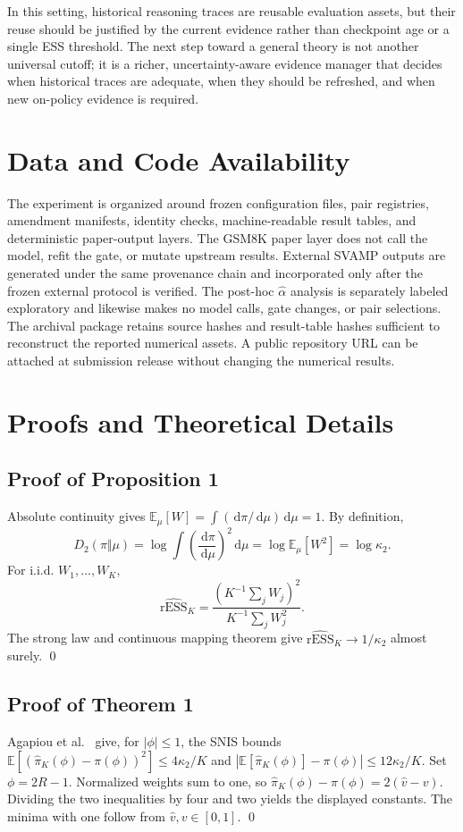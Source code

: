 \documentclass[10pt]{article}
\theoremstyle{remark}
\newcommand{\E}{\mathbb{E}}
\newcommand{\rESS}{\mathrm{rESS}}
\newcommand{\dd}{\,\mathrm{d}}
\begin{document}
In this setting, historical reasoning traces are reusable evaluation assets, but their reuse should be justified by the current evidence rather than checkpoint age or a single ESS threshold. The next step toward a general theory is not another universal cutoff; it is a richer, uncertainty-aware evidence manager that decides when historical traces are adequate, when they should be refreshed, and when new on-policy evidence is required.

\section*{Data and Code Availability}
The experiment is organized around frozen configuration files, pair registries, amendment manifests, identity checks, machine-readable result tables, and deterministic paper-output layers. The GSM8K paper layer does not call the model, refit the gate, or mutate upstream results. External SVAMP outputs are generated under the same provenance chain and incorporated only after the frozen external protocol is verified. The post-hoc $\widehat\alpha$ analysis is separately labeled exploratory and likewise makes no model calls, gate changes, or pair selections. The archival package retains source hashes and result-table hashes sufficient to reconstruct the reported numerical assets. A public repository URL can be attached at submission release without changing the numerical results.

\appendix
\section{Proofs and Theoretical Details}
\subsection{Proof of Proposition 1}
Absolute continuity gives $\E_\mu[W]=\int (\dd\pi/\dd\mu)\dd\mu=1$. By definition,
\[
D_2(\pi\Vert\mu)=\log\int\left(\frac{\dd\pi}{\dd\mu}\right)^2\dd\mu=\log\E_\mu[W^2]=\log\kappa_2.
\]
For i.i.d. $W_1,\ldots,W_K$,
\[
\widehat{\rESS}_K=\frac{(K^{-1}\sum_jW_j)^2}{K^{-1}\sum_jW_j^2}.
\]
The strong law and continuous mapping theorem give $\widehat{\rESS}_K\to1/\kappa_2$ almost surely. \qed

\subsection{Proof of Theorem 1}
Agapiou et al.~\cite{agapiou2017} give, for $|\phi|\le1$, the SNIS bounds $\E[(\widehat\pi_K(\phi)-\pi(\phi))^2]\le4\kappa_2/K$ and $|\E[\widehat\pi_K(\phi)]-\pi(\phi)|\le12\kappa_2/K$. Set $\phi=2R-1$. Normalized weights sum to one, so $\widehat\pi_K(\phi)-\pi(\phi)=2(\widehat v-v)$. Dividing the two inequalities by four and two yields the displayed constants. The minima with one follow from $\widehat v,v\in[0,1]$. \qed
\end{document}
